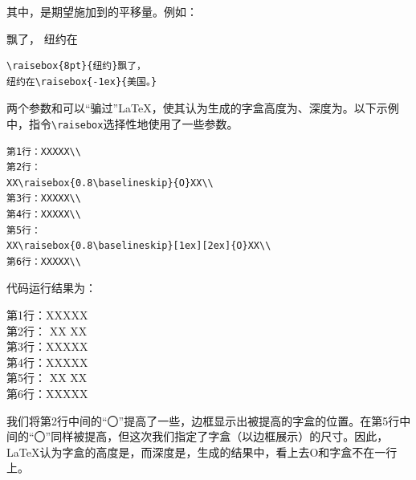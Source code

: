 其中，是期望施加到的平移量。例如：

\begin{codelist}[4.12]{
飘了，
纽约在
}
\begin{verbatim}
\raisebox{8pt}{纽约}飘了，
纽约在\raisebox{-1ex}{美国。}\end{verbatim}
\end{codelist}

两个参数和可以“骗过”\LaTeX ，使其认为生成的字盒高度为、深度为。以下示例中，指令\verb|\raisebox|选择性地使用了一些参数。

\begin{dmd}
  \begin{verbatim}
第1行：XXXXX\\
第2行：
XX\raisebox{0.8\baselineskip}{O}XX\\
第3行：XXXXX\\
第4行：XXXXX\\
第5行：
XX\raisebox{0.8\baselineskip}[1ex][2ex]{O}XX\\ 
第6行：XXXXX\\
  \end{verbatim}
\end{dmd}

代码运行结果为：

\newcommand{\blob}{\makebox[\tmplength]{O}}

\begin{flushleft}
  第1行：XXXXX\\
  第2行：
  XX\hspace{-\fboxrule}%
  \fbox{\raisebox{0.8\baselineskip}{\blob}}%
  \hspace{-\fboxrule}XX \\
  第3行：XXXXX\\
  第4行：XXXXX\\
  第5行：
  XX\hspace{-\fboxrule}%
  \fbox{\raisebox{0.8\baselineskip}[1ex][2ex]{\blob}}%
  \hspace{-\fboxrule}XX \\
  第6行：XXXXX\\
\end{flushleft}

我们将第2行中间的“〇”提高了一些，边框显示出被提高的字盒的位置。在第5行中间的“〇”同样被提高，但这次我们指定了字盒（以边框展示）的尺寸。因此，\LaTeX 认为字盒的高度是\dm{1ex}，而深度是\dm{2ex}，生成的结果中，看上去O和字盒不在一行上。

